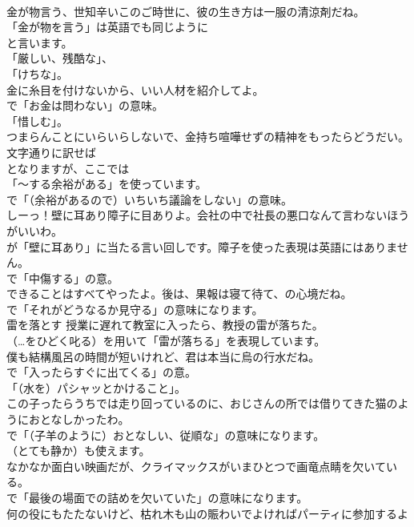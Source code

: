 \documentclass[8pt]{extreport}
\begin{document}
\begin{CJK}{UTF8}{min}
\\	金が物言う、世知辛いこのご時世に、彼の生き方は一服の清涼剤だね。 
\\	「金が物を言う」は英語でも同じように
\\	と言います。
\\	「厳しい、残酷な」、
\\	「けちな」。	
\\	金に糸目を付けないから、いい人材を紹介してよ。 
\\	で「お金は問わない」の意味。
\\	「惜しむ」。	
\\	つまらんことにいらいらしないで、金持ち喧嘩せずの精神をもったらどうだい。 
\\	文字通りに訳せば
\\	となりますが、ここでは
\\	「～する余裕がある」を使っています。
\\	で「（余裕があるので）いちいち議論をしない」の意味。	
\\	しーっ！壁に耳あり障子に目ありよ。会社の中で社長の悪口なんて言わないほうがいいわ。 
\\	が「壁に耳あり」に当たる言い回しです。障子を使った表現は英語にはありません。
\\	で「中傷する」の意。	
\\	できることはすべてやったよ。後は、果報は寝て待て、の心境だね。 
\\	で「それがどうなるか見守る」の意味になります。	
\\	雷を落とす 授業に遅れて教室に入ったら、教授の雷が落ちた。 
\\	（…をひどく叱る）を用いて「雷が落ちる」を表現しています。	
\\	僕も結構風呂の時間が短いけれど、君は本当に烏の行水だね。 
\\	で「入ったらすぐに出てくる」の意。
\\	「（水を）パシャッとかけること」。	
\\	この子ったらうちでは走り回っているのに、おじさんの所では借りてきた猫のようにおとなしかったわ。 
\\	で「（子羊のように）おとなしい、従順な」の意味になります。
\\	（とても静か）も使えます。	
\\	なかなか面白い映画だが、クライマックスがいまひとつで画竜点睛を欠いている。 
\\	で「最後の場面での詰めを欠いていた」の意味になります。	
\\	何の役にもたたないけど、枯れ木も山の賑わいでよければパーティに参加するよ 

\end{CJK}
\end{document}

